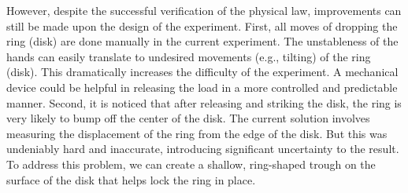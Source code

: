 However, despite the successful verification of the physical law, improvements can still be made upon the design of the experiment. First, all moves of dropping the ring (disk) are done manually in the current experiment. The unstableness of the hands can easily translate to undesired movements (e.g., tilting) of the ring (disk). This dramatically increases the difficulty of the experiment. A mechanical device could be helpful in releasing the load in a more controlled and predictable manner. Second, it is noticed that after releasing and striking the disk, the ring is very likely to bump off the center of the disk. The current solution involves measuring the displacement of the ring from the edge of the disk. But this was undeniably hard and inaccurate, introducing significant uncertainty to the result. To address this problem, we can create a shallow, ring-shaped trough on the surface of the disk that helps lock the ring in place. 



